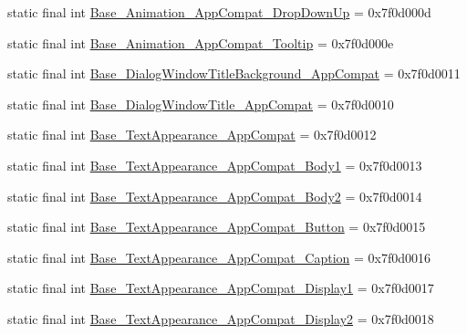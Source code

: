 \begin{DoxyCompactItemize}
\item 
static final int \mbox{\hyperlink{classandroid_1_1support_1_1v7_1_1appcompat_1_1R_1_1style_a4aca380ad013eedfbbaff287c795f15f}{Base\+\_\+\+Animation\+\_\+\+App\+Compat\+\_\+\+Drop\+Down\+Up}} = 0x7f0d000d
\item 
static final int \mbox{\hyperlink{classandroid_1_1support_1_1v7_1_1appcompat_1_1R_1_1style_a26dfea705746169245a38dac9010188e}{Base\+\_\+\+Animation\+\_\+\+App\+Compat\+\_\+\+Tooltip}} = 0x7f0d000e
\item 
static final int \mbox{\hyperlink{classandroid_1_1support_1_1v7_1_1appcompat_1_1R_1_1style_a7be1e72934eb4819115aa709d7f0557c}{Base\+\_\+\+Dialog\+Window\+Title\+Background\+\_\+\+App\+Compat}} = 0x7f0d0011
\item 
static final int \mbox{\hyperlink{classandroid_1_1support_1_1v7_1_1appcompat_1_1R_1_1style_abb6cb9ab09c33c7cd2c90e308f22f499}{Base\+\_\+\+Dialog\+Window\+Title\+\_\+\+App\+Compat}} = 0x7f0d0010
\item 
static final int \mbox{\hyperlink{classandroid_1_1support_1_1v7_1_1appcompat_1_1R_1_1style_aafd21559a2cbd3a1242e39411a1c254c}{Base\+\_\+\+Text\+Appearance\+\_\+\+App\+Compat}} = 0x7f0d0012
\item 
static final int \mbox{\hyperlink{classandroid_1_1support_1_1v7_1_1appcompat_1_1R_1_1style_a00a15bd8d16faa2ae2a57b12caa194ed}{Base\+\_\+\+Text\+Appearance\+\_\+\+App\+Compat\+\_\+\+Body1}} = 0x7f0d0013
\item 
static final int \mbox{\hyperlink{classandroid_1_1support_1_1v7_1_1appcompat_1_1R_1_1style_a124b888677a509b72b45675f52a2a89a}{Base\+\_\+\+Text\+Appearance\+\_\+\+App\+Compat\+\_\+\+Body2}} = 0x7f0d0014
\item 
static final int \mbox{\hyperlink{classandroid_1_1support_1_1v7_1_1appcompat_1_1R_1_1style_a827438275a100bb2fb760ef2221d58d0}{Base\+\_\+\+Text\+Appearance\+\_\+\+App\+Compat\+\_\+\+Button}} = 0x7f0d0015
\item 
static final int \mbox{\hyperlink{classandroid_1_1support_1_1v7_1_1appcompat_1_1R_1_1style_a2ef1c9b096b9033d2f83f3ac6e9221ec}{Base\+\_\+\+Text\+Appearance\+\_\+\+App\+Compat\+\_\+\+Caption}} = 0x7f0d0016
\item 
static final int \mbox{\hyperlink{classandroid_1_1support_1_1v7_1_1appcompat_1_1R_1_1style_adf7dad2dee465c9c31291d46810dad19}{Base\+\_\+\+Text\+Appearance\+\_\+\+App\+Compat\+\_\+\+Display1}} = 0x7f0d0017
\item 
static final int \mbox{\hyperlink{classandroid_1_1support_1_1v7_1_1appcompat_1_1R_1_1style_a106d31659ce18797c37ec094836662a5}{Base\+\_\+\+Text\+Appearance\+\_\+\+App\+Compat\+\_\+\+Display2}} = 0x7f0d0018

\end{DoxyCompactItemize}
